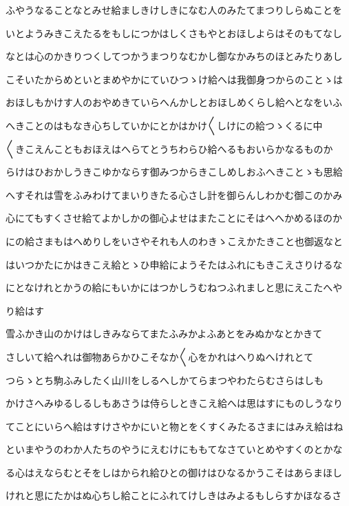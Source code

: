 \documentclass[a4paper,11pt,landscape]{ltjtarticle}
\begin{document}
\par\medskip
ふやうなることなとみせ給ましきけしきになむ人のみたてまつりしらぬことを
\par\medskip
いとようみきこえたるをもしにつかはしくさもやとおほしよらはそのもてなし
\par\medskip
なとは心のかきりつくしてつかうまつりなむかし御なかみちのほとみたりあし
\par\medskip
こそいたからめといとまめやかにていひつゝけ給へは我御身つからのことゝは
\par\medskip
おほしもかけす人のおやめきていらへんかしとおほしめくらし給へとなをいふ
\par\medskip
へきことのはもなき心ちしていかにとかはかけ〱しけにの給つゝくるに中
\par\medskip
〱きこえんこともおほえはへらてとうちわらひ給へるもおいらかなるものか
\par\medskip
らけはひおかしうきこゆかならす御みつからきこしめしおふへきことゝも思給
\par\medskip
へすそれは雪をふみわけてまいりきたる心さし計を御らんしわかむ御このかみ
\par\medskip
心にてもすくさせ給てよかしかの御心よせはまたことにそはへへかめるほのか
\par\medskip
にの給さまもはへめりしをいさやそれも人のわきゝこえかたきこと也御返なと
\par\medskip
はいつかたにかはきこえ給とゝひ申給にようそたはふれにもきこえさりけるな
\par\medskip
にとなけれとかうの給にもいかにはつかしうむねつふれましと思にえこたへや
\par\medskip
り給はす
\par\medskip
雪ふかき山のかけはしきみならてまたふみかよふあとをみぬかなとかきて
\par\medskip
さしいて給へれは御物あらかひこそなか〱心をかれはへりぬへけれとて
\par\medskip
つらゝとち駒ふみしたく山川をしるへしかてらまつやわたらむさらはしも
\par\medskip
かけさへみゆるしるしもあさうは侍らしときこえ給へは思はすにものしうなり
\par\medskip
てことにいらへ給はすけさやかにいと物とをくすくみたるさまにはみえ給はね
\par\medskip
といまやうのわか人たちのやうにえむけにももてなさていとめやすくのとかな
\par\medskip
る心はえならむとそをしはかられ給ひとの御けはひなるかうこそはあらまほし
\par\medskip
けれと思にたかはぬ心ちし給ことにふれてけしきはみよるもしらすかほなるさ
\end{document}
